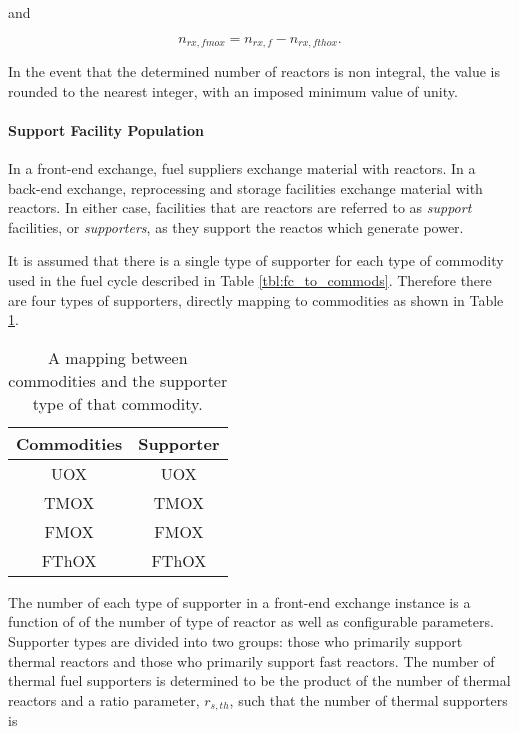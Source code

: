 and

\begin{equation}
n_{rx, fmox} = n_{rx, f} - n_{rx, fthox}.
\end{equation}

In the event that the determined number of reactors is non integral, the value
is rounded to the nearest integer, with an imposed minimum value of unity.

\paragraph{Support Facility Population}

In a front-end exchange, fuel suppliers exchange material with reactors. In a
back-end exchange, reprocessing and storage facilities exchange material with
reactors. In either case, facilities that are  reactors are referred
to as \textit{support} facilities, or \textit{supporters}, as they support
the reactos which generate power.

It is assumed that there is a single type of supporter for each type of commodity
used in the fuel cycle described in Table \ref{tbl:fc_to_commods}. Therefore
there are four types of supporters, directly mapping to commodities as shown in
Table \ref{tbl:commod_to_sup}.

\begin{table}[h]
\centering
\caption{A mapping between commodities and the supporter type of that commodity.}
\label{tbl:commod_to_sup}
\begin{tabular}{|c|c|}
\hline
Commodities            & Supporter \\ \hline
UOX                    & UOX         \\ \hline
TMOX                    & TMOX         \\ \hline
FMOX                    & FMOX         \\ \hline
FThOX                    & FThOX         \\ \hline
\end{tabular}
\end{table}

The number of each type of supporter in a front-end exchange instance is a
function of of the number of type of reactor as well as configurable
parameters. Supporter types are divided into two groups: those who primarily
support thermal reactors and those who primarily support fast reactors. The
number of thermal fuel supporters is determined to be the product of the number
of thermal reactors and a ratio parameter, $r_{s, th}$, such that the number of
thermal supporters is

